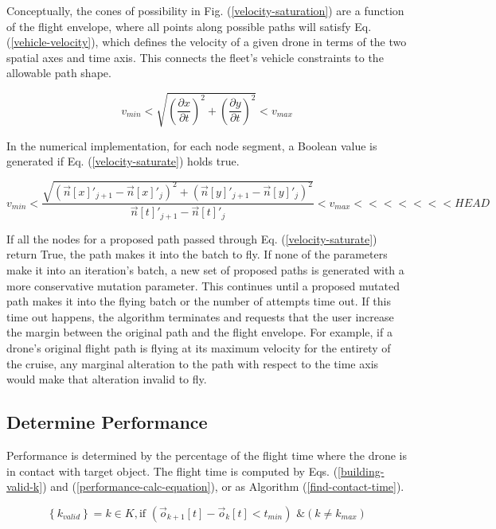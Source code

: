 \documentclass[conf]{new-aiaa}
\begin{document}
Conceptually, the cones of possibility in Fig. (\ref{velocity-saturation}) are a function of the flight envelope, where all points along possible paths will satisfy Eq. (\ref{vehicle-velocity}), which defines the velocity of a given drone in terms of the two spatial axes and time axis. This connects the fleet's vehicle constraints to the allowable path shape.

\begin{equation}
\label{vehicle-velocity}
v_{min} < \sqrt{\left(\frac{\partial{x}}{\partial{t}}\right)^2 + \left(\frac{\partial{y}}{\partial{t}}\right)^2} < v_{max}
\end{equation}

In the numerical implementation, for each node segment, a Boolean value is generated if Eq. (\ref{velocity-saturate}) holds true.

\begin{equation}
\label{velocity-saturate}
v_{min} < \frac{\sqrt{\left(\vec{n}[x]'_{j + 1} - \vec{n}[x]'_{j}\right)^2 + \left(\vec{n}[y]'_{j + 1} - \vec{n}[y]'_{j}\right)^2}}{\vec{n}[t]'_{j + 1} - \vec{n}[t]'_{j}} < v_{max}
<<<<<<< HEAD
\end{equation}

If all the nodes for a proposed path passed through Eq. (\ref{velocity-saturate}) return True, the path makes it into the batch to fly. If none of the parameters make it into an iteration's batch, a new set of proposed paths is generated with a more conservative mutation parameter. This continues until a proposed mutated path makes it into the flying batch or the number of attempts time out. If this time out happens, the algorithm terminates and requests that the user increase the margin between the original path and the flight envelope. For example, if a drone's original flight path is flying at its maximum velocity for the entirety of the cruise, any marginal alteration to the path with respect to the time axis would make that alteration invalid to fly.

\subsection{Determine Performance}
Performance is determined by the percentage of the flight time where the drone is in contact with target object. The flight time is computed by Eqs. (\ref{building-valid-k}) and (\ref{performance-calc-equation}), or as Algorithm (\ref{find-contact-time}).

\begin{equation}
\label{building-valid-k}
\left\{k_{valid}\right\} = k \in K, \text{if } \left(\vec{o}_{k + 1}[t] - \vec{o}_k[t] < t_{min}\right) \text{ \& } \left(k \neq k_{max}\right)
\end{equation}
\end{document}
